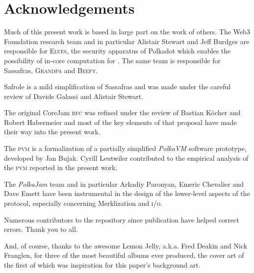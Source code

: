 \section{Acknowledgements}

Much of this present work is based in large part on the work of others. The Web3 Foundation research team and in particular Alistair Stewart and Jeff Burdges are responsible for \textsc{Elves}, the security apparatus of Polkadot which enables the possibility of in-core computation for \Jam. The same team is responsible for Sassafras, \textsc{Grandpa} and \textsc{Beefy}.

Safrole is a mild simplification of Sassafras and was made under the careful review of Davide Galassi and Alistair Stewart.

The original CoreJam \textsc{rfc} was refined under the review of Bastian Köcher and Robert Habermeier and most of the key elements of that proposal have made their way into the present work.

The \textsc{pvm} is a formalization of a partially simplified \emph{PolkaVM} software prototype, developed by Jan Bujak. Cyrill Leutwiler contributed to the empirical analysis of the \textsc{pvm} reported in the present work.

The \emph{PolkaJam} team and in particular Arkadiy Paronyan, Emeric Chevalier and Dave Emett have been instrumental in the design of the lower-level aspects of the \Jam protocol, especially concerning Merklization and \textsc{i/o}.

Numerous contributors to the repository since publication have helped correct errors. Thank you to all.

And, of course, thanks to the awesome Lemon Jelly, a.k.a. Fred Deakin and Nick Franglen, for three of the most beautiful albums ever produced, the cover art of the first of which was inspiration for this paper's background art.